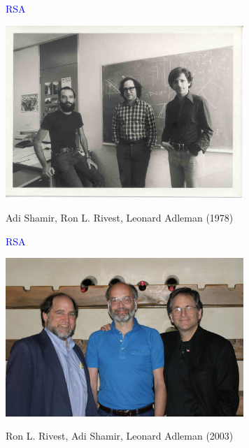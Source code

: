\documentclass[landscape]{powersem} %
\begin{document}
\begin{slide}

\centerline{\Large{\textcolor{blue}{RSA}}}

\centerline{\includegraphics[width=9cm]{images/rsa-photo.jpg}}

\centerline{Adi Shamir, Ron L. Rivest, Leonard Adleman (1978)}
\end{slide}

\begin{slide}

\centerline{\Large{\textcolor{blue}{RSA}}}

\centerline{\includegraphics[width=9cm]{images/RSA-2003.jpg}}

\centerline{Ron L. Rivest, Adi Shamir, Leonard Adleman (2003)}
\end{slide}
\end{document}
